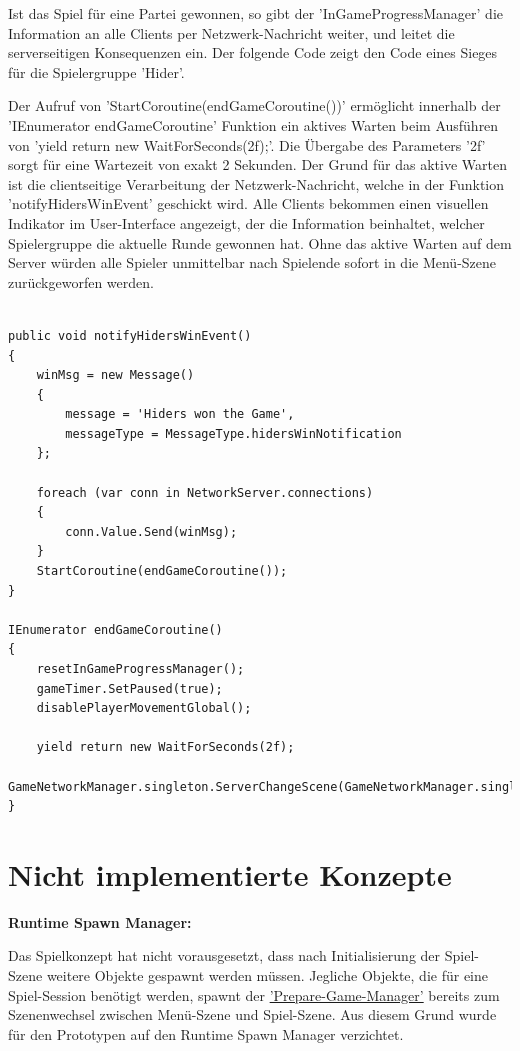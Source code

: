 Ist das Spiel für eine Partei gewonnen, so gibt der 'InGameProgressManager' die Information an alle Clients per Netzwerk-Nachricht weiter, und leitet die serverseitigen Konsequenzen ein. Der folgende Code zeigt den Code eines Sieges für die Spielergruppe 'Hider'. 

Der Aufruf von 'StartCoroutine(endGameCoroutine())' ermöglicht innerhalb der 'IEnumerator endGameCoroutine' Funktion ein aktives Warten beim Ausführen von 'yield return new WaitForSeconds(2f);'. Die Übergabe des Parameters '2f' sorgt für eine Wartezeit von exakt 2 Sekunden. Der Grund für das aktive Warten ist die clientseitige Verarbeitung der Netzwerk-Nachricht, welche in der Funktion 'notifyHidersWinEvent' geschickt wird. Alle Clients bekommen einen visuellen Indikator im User-Interface angezeigt, der die Information beinhaltet, welcher Spielergruppe die aktuelle Runde gewonnen hat. Ohne das aktive Warten auf dem Server würden alle Spieler unmittelbar nach Spielende sofort in die Menü-Szene zurückgeworfen werden.

\begin{lstlisting}[caption= InGameProgressManager.cs Win Event]
	
public void notifyHidersWinEvent()
{
	winMsg = new Message()
	{
		message = 'Hiders won the Game',
		messageType = MessageType.hidersWinNotification
	};
		
	foreach (var conn in NetworkServer.connections)
	{
		conn.Value.Send(winMsg);
	}	
	StartCoroutine(endGameCoroutine());
}

IEnumerator endGameCoroutine()
{
	resetInGameProgressManager();
	gameTimer.SetPaused(true);
	disablePlayerMovementGlobal();
	
	yield return new WaitForSeconds(2f);
	GameNetworkManager.singleton.ServerChangeScene(GameNetworkManager.singleton.offlineScene);
}

\end{lstlisting}

\section{Nicht implementierte Konzepte}
\textbf{Runtime Spawn Manager:}

Das Spielkonzept hat nicht vorausgesetzt, dass nach Initialisierung der Spiel-Szene weitere Objekte gespawnt werden müssen. Jegliche Objekte, die für eine Spiel-Session benötigt werden, spawnt der \hyperref[Implementierung:prepare_game_manager]{'Prepare-Game-Manager'} bereits zum Szenenwechsel zwischen Menü-Szene und Spiel-Szene. Aus diesem Grund wurde für den Prototypen auf den Runtime Spawn Manager verzichtet.

